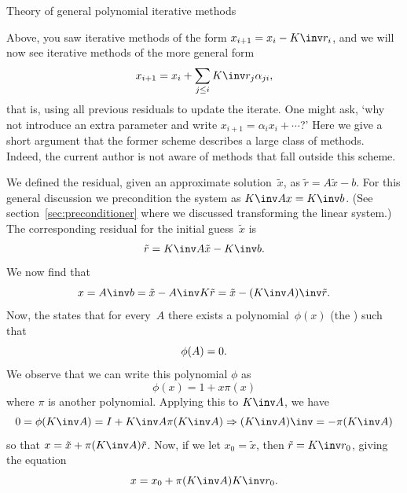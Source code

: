 
 {Theory of general polynomial iterative methods}
\label{sec:nonstationary}

Above, you saw iterative methods of the form $x_{i+1}=x_i-K\inv r_i$,
and we will now see iterative methods of the more general form
\begin{equation}
  x_{i+1}=x_i+\sum_{j\leq i}K\inv r_j\alpha_{ji},
  \label{eq:it-general-x}
\end{equation}
that is, using all previous residuals to update the iterate.
One might ask, `why not introduce an extra
parameter and write $x_{i+1}=\alpha_i x_i+\cdots$?' Here we give a
short argument that the former scheme describes a large class of
methods. Indeed, the current author is not aware of methods that fall
outside this scheme.

We defined the residual, given an approximate solution~$\tilde x$, as
$ \tilde r=A\tilde x-b $. For this general discussion we precondition the system
as $K\inv Ax=K\inv b$. (See section~\ref{sec:preconditioner} where we
discussed transforming the linear system.)
The corresponding residual for the initial
guess~$\tilde x$ is
\[ \tilde r = K\inv A\tilde x-K\inv b. \]
We now find that 
\[ x=A\inv b=\tilde x-A\inv K\tilde r = \tilde x-(K\inv A)\inv \tilde r. \]
%
Now, the  states that for
every~$ A $ there exists a polynomial~$\phi(x)$
(the
%
) such that
\[ \phi(A)=\nobreak0 .\]
We observe that we can write this polynomial $\phi$ as
\[ \phi(x)=1+x\pi(x) \]
where $\pi$ is another polynomial.
%
Applying this to $K\inv A$, we have
\[
  0 = \phi( K\inv A ) = I + K\inv A \pi( K\inv A ) 
  \Rightarrow
  (K\inv A)\inv=-\pi(K\inv A)
\]
so that $ x = \tilde x + \pi(K\inv A)\tilde r $. Now, if we let
$x_0=\tilde x$, then $\tilde r = K\inv r_0$, giving the equation
\[ x = x_0 + \pi(K\inv A)K\inv r_0. \]

